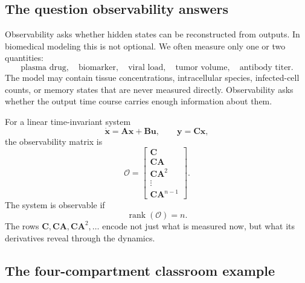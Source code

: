 \documentclass[a4paper]{article}
\DeclareMathOperator{\rank}{rank}
\newcommand{\vect}[1]{\boldsymbol{#1}}
\newcommand{\mat}[1]{\mathbf{#1}}
\newcommand{\A}{\mat A}
\newcommand{\B}{\mat B}
\newcommand{\C}{\mat C}
\newcommand{\Obs}{\mathcal O}
\begin{document}
\subsection{The question observability answers}

Observability asks whether hidden states can be reconstructed from outputs. In biomedical modeling this is not optional. We often measure only one or two quantities:
\[
  \text{plasma drug},\quad
  \text{biomarker},\quad
  \text{viral load},\quad
  \text{tumor volume},\quad
  \text{antibody titer}.
\]
The model may contain tissue concentrations, intracellular species, infected-cell counts, or memory states that are never measured directly. Observability asks whether the output time course carries enough information about them.

For a linear time-invariant system
\[
  \dot{\vect x}=\A\vect x+\B\vect u,\qquad \vect y=\C\vect x,
\]
the observability matrix is
\[
  \Obs =
  \begin{bmatrix}
  \C\\
  \C\A\\
  \C\A^2\\
  \vdots\\
  \C\A^{n-1}
  \end{bmatrix}.
\]
The system is observable if
\[
  \rank(\Obs)=n.
\]
The rows \(\C,\C\A,\C\A^2,\ldots\) encode not just what is measured now, but what its derivatives reveal through the dynamics.

\subsection{The four-compartment classroom example}
\end{document}
